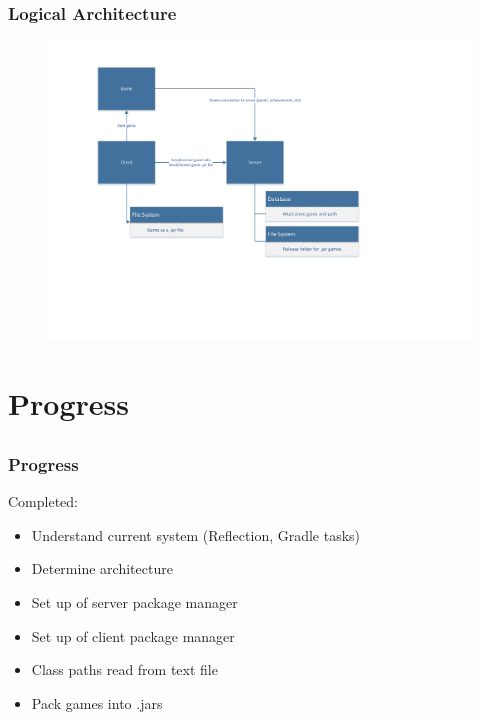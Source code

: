 \documentclass{beamer}
\begin{document}
\begin{frame}
    \frametitle{Logical Architecture}
    
    \begin{figure}[!hbp]
        \centering
        \includegraphics[trim=3cm 5cm 5cm 2cm,
                         clip=true,
                         width=\textwidth]{logarch.pdf}
    \end{figure}
    
\end{frame}

\section{Progress} %
\subsection{}

\begin{frame}
    \frametitle{Progress}
    
    Completed:
    
    \begin{itemize}
        \item   Understand current system (Reflection, Gradle tasks)
        \item   Determine architecture
        \item   Set up of server package manager
        \item   Set up of client package manager
        \item   Class paths read from text file
        \item   Pack games into .jars
    \end{itemize}
\end{frame}
\end{document}
